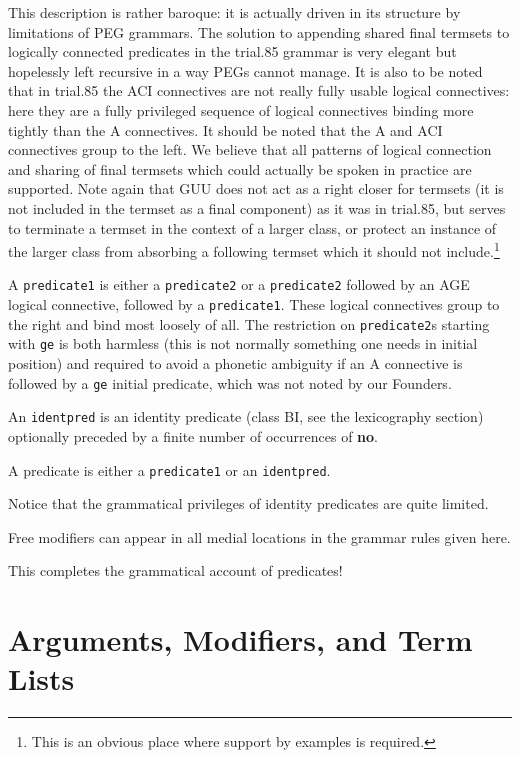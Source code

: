 \documentclass[12pt]{book}
\begin{document}
{This description is rather baroque:  it is actually driven in its structure by limitations of PEG grammars.  The solution to appending shared final termsets to logically connected predicates in the trial.85 grammar is very elegant but hopelessly left recursive in a way PEGs cannot manage.  It is also to be noted that in trial.85 the ACI connectives are not really fully usable logical connectives:  here they are a fully privileged sequence of logical connectives binding more tightly than the A connectives.  It should be noted that the A and ACI connectives group to the left.  We believe that all patterns of logical connection and sharing of final termsets which could actually be spoken in practice are supported.  Note again that GUU does not act as a right closer for termsets (it is not included in the termset as a final component) as it was in trial.85, but serves to terminate a termset in the context of a larger class, or protect an instance of the larger class from absorbing a following termset which it should not include.\footnote{This is an obvious place where support by examples is required.}

A {\tt predicate1} is either a {\tt predicate2} or a {\tt predicate2} followed by an AGE logical connective, followed by a {\tt predicate1}.  These
logical connectives group to the right and bind most loosely of all.  The restriction on {\tt predicate2}s starting with {\tt ge} is both harmless
(this is not normally something one needs in initial position) and required to avoid a phonetic ambiguity if an A connective is followed by a {\tt ge} initial predicate, which was not noted by our Founders.

An {\tt identpred} is an identity predicate (class BI, see the lexicography section) optionally preceded by a finite number of occurrences of {\bf no}.

A predicate is either a {\tt predicate1} or an {\tt identpred}.

Notice that the grammatical privileges of identity predicates are quite limited.

Free modifiers can appear in all medial locations in the grammar rules given here.

This completes the grammatical account of predicates!


\newpage

\section{Arguments, Modifiers, and Term Lists}

}
\end{document}
